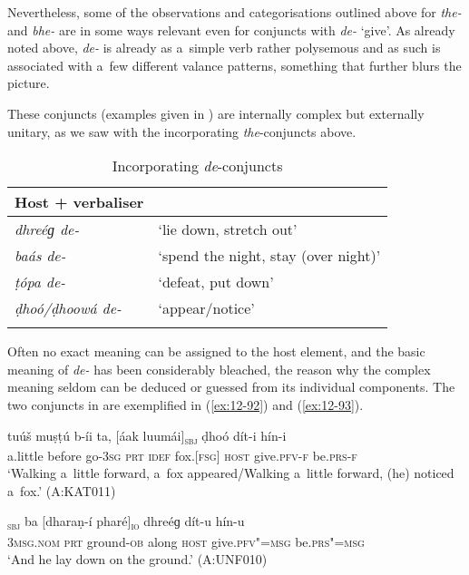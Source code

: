 Nevertheless, some of the observations and categorisations outlined above for \textit{the-} and \textit{bhe-} are in some ways relevant even for conjuncts with \textit{de-} `give'. As already noted above, \textit{de-} is already as a~simple verb rather polysemous and as such is associated with a~few different valance patterns, something that further blurs the picture.


 These conjuncts (examples given in ) are internally complex but externally unitary, as we saw with the incorporating \textit{the}-conjuncts above. 


\begin{table}[ht]
\caption{Incorporating \textit{de}-conjuncts}
\begin{tabularx}{.75\textwidth}{ l@{\hspace{45pt}} Q }
\lsptoprule
Host + verbaliser &
\\\hline
\textit{dhreéɡ de-} &
`lie down, stretch out'\\
\textit{baás de-} &
`spend the night, stay (over night)'\\
\textit{ṭópa de-} &
`defeat, put down'\\
\textit{ḍhoó/ḍhoowá de-} &
`appear/notice'\\\lspbottomrule
\end{tabularx}
\label{tab:12-7}
\end{table}


Often no exact meaning can be assigned to the host element, and the basic meaning of \textit{de-} has been considerably bleached, the reason why the complex meaning seldom can be deduced or guessed from its individual components. The two conjuncts in  are exemplified in (\ref{ex:12-92}) and (\ref{ex:12-93}).

\begin{exe}
\ex
\label{ex:12-92}
\gll tuúš muṣṭú b-íi ta, [áak luumái]\textsubscript{\textsc{sbj}} ḍhoó dít-i hín-i \\
a.little before go-\textsc{3sg} \textsc{prt} \textsc{idef} fox.[\textsc{fsg]} \textsc{host} give.\textsc{pfv-f} be.\textsc{prs-f} \\
\glt `Walking a~little forward, a~fox appeared/Walking a~little forward, (he) noticed a~fox.' (A:KAT011)
\end{exe}
\begin{exe}
\ex
\label{ex:12-93}
\gll [so]\textsubscript{\textsc{sbj}} ba [dharaṇ-í pharé]\textsubscript{\textsc{io}} dhreéɡ dít-u hín-u \\
\textsc{3msg.nom} \textsc{prt} ground-\textsc{ob} along \textsc{host}  give.\textsc{pfv"=msg} be.\textsc{prs"=msg} \\
\glt `And he lay down on the ground.' (A:UNF010)
\end{exe}

